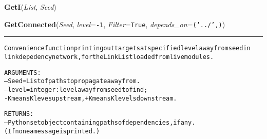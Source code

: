     \label{System:LinkManagement:GetI}

    \vspace{0.5ex}

\hspace{.8\funcindent}\begin{boxedminipage}{\funcwidth}

    \raggedright \textbf{GetI}(\textit{List}, \textit{Seed})

\setlength{\parskip}{2ex}
\setlength{\parskip}{1ex}
    \end{boxedminipage}

    \label{System:LinkManagement:GetConnected}

    \vspace{0.5ex}

\hspace{.8\funcindent}\begin{boxedminipage}{\funcwidth}

    \raggedright \textbf{GetConnected}(\textit{Seed}, \textit{level}={\tt -1}, \textit{Filter}={\tt True}, \textit{depends\_on}={\tt ('../',)})

    \vspace{-1.5ex}

    \rule{\textwidth}{0.5\fboxrule}
\setlength{\parskip}{2ex}
\begin{alltt}

Convenience function printing out targets at specified level away from seed in
link depedency network, for the LinkList loaded from live modules. 
        
ARGUMENTS:
--Seed = List of paths to propagate away from.          
--level = integer : level away from seed to find ; 
        -K means K leves upstream, +K means K levels downstream. 

RETURNS:
--Python set object containing paths of dependencies, if any.  
(If none a message is printed.)
\end{alltt}

\setlength{\parskip}{1ex}
    \end{boxedminipage}

    \label{System:LinkManagement:LoadLiveModules}

